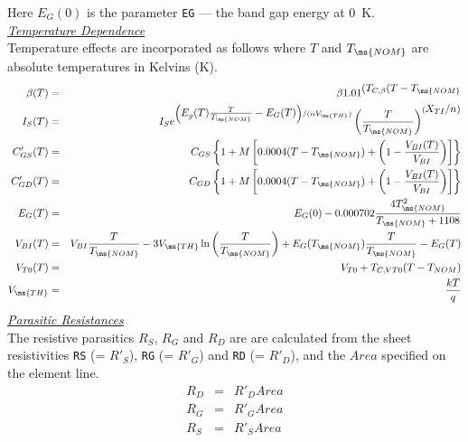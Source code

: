 Here $E_G(0)$ is the parameter {\tt EG} --- the band gap energy at 0~K.\\[0.2in]
\noindent\underline{\sl \large Temperature Dependence}
 \\[0.1in]
Temperature effects are incorporated as follows where $T$ and
$T_{\ms{NOM}}$ are absolute temperatures in Kelvins (K).
\begin{eqnarray}
\beta(T) & = & \beta 1.01^{\textstyle(T_{C,\beta}(T-T_{\ms{NOM}}}\\
I_S (T) & = & I_S e^{\left( \textstyle E_g(T) {T \over
{T_{\ms{NOM}}}}
 - E_G(T) \right) /(nV_{\ms{TH}})}
    \left({{\textstyle T}\over{\textstyle T_{\ms{NOM}}}}
    \right)^{(\textstyle X_{TI}/n)}\\
C'_{GS} (T)&=&C_{GS}\left\{1 + M
\left[0.0004(T-T_{\ms{NOM}})+\left(1-
   {{\textstyle V_{BI} (T)} \over {V_{BI}}}\right) \right]\right\} \\
C'_{GD} (T)&=&C_{GD}\left\{1 + M
\left[0.0004(T-T_{\ms{NOM}})+\left(1-
   {{\textstyle V_{BI} (T)} \over {V_{BI}}}\right) \right]\right\} \\
E_G(T) & = & E_G(0) - 0.000702{{4T_{\ms{NOM}}^2} \over {T_{\ms{NOM}}+1108}}\\
V_{BI} (T) & = & V_{BI} {T \over {T_{\ms{NOM}}}}
 - 3V_{\ms{TH}} \ln{\left( {{T} \over {T_{\ms{NOM}}}}\right) }
              + E_G (T_{\ms{NOM}}) {T \over {T_{\ms{NOM}}}} -E_G(T)\\
V_{T0}(T)&=&V_{T0} + T_{C,VT0}(T- T_{NOM})\\
V_{\ms{TH}} & = & {{kT} \over q}
\end{eqnarray}
\noindent\underline{\sl \large Parasitic Resistances}\\[0.1in]
  
 
 
  The resistive
parasitics $R_S$, $R_G$ and $R_D$ are are calculated from the
sheet resistivities {\tt RS} (= $R'_S$), {\tt RG} (= $R'_G$) and
{\tt RD} (= $R'_D$), and the $Area$ specified on the element line.
\begin{eqnarray}
R_D & = & R'_D Area\\
R_G & = & R'_G Area\\
R_S & = & R'_S Area
\end{eqnarray}
